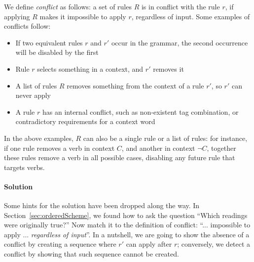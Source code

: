 We define \emph{conflict} as follows: a set of rules $R$ is in conflict with the rule $r$, if applying $R$ makes it impossible to apply $r$, regardless of input.
Some examples of conflicts follow:

\begin{itemize}
\item If two equivalent rules $r$ and $r'$ occur in the grammar, the second occurrence will be disabled by the first
\item Rule $r$ selects something in a context, and $r'$ removes it
\item A list of rules $R$ removes something from the context of a rule $r'$, so $r'$ can never apply
\item A rule $r$ has an internal conflict, such as non-existent
tag combination, or contradictory requirements for a context word
\end{itemize}
In the above examples, $R$ can also be a single rule or a list of rules: for instance, if one rule removes a verb in
context $C$, and another in context $\neg C$, together these rules
remove a verb in all possible cases, disabling any future rule that
targets verbs.


\paragraph{Solution}
Some hints for the solution have been dropped along the way. 
In Section~\ref{sec:orderedScheme}, we found how to ask the question 
``Which readings were originally true?'' Now match it to the definition of conflict: ``... impossible to apply ... \emph{regardless of input}''.
In a nutshell, we are going to show the absence of a conflict by creating 
a sequence where $r'$ can apply after $r$; conversely, we detect a conflict by 
showing that such sequence cannot be created.






